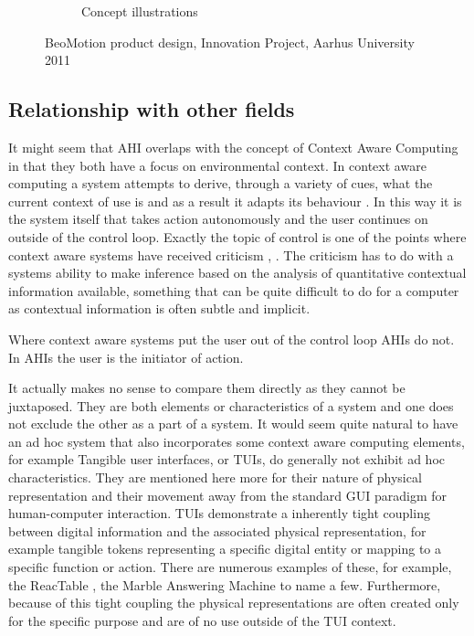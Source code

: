 \begin{figure}
\begin{subfigure}{.54\textwidth}
		\caption{Concept illustrations}
	\end{subfigure}
	\caption{BeoMotion product design, Innovation Project, Aarhus University 2011}
	\label{fig:ch:adhoc:beomotion}
\end{figure}

\subsection{Relationship with other fields} 
It might seem that AHI overlaps with the concept of Context Aware Computing in that they both have a focus on environmental context.
In context aware computing a system attempts to derive, through a variety of cues, what the current context of use is and as a result it adapts its behaviour \citep[chap. 8]{krumm2009ubiquitous}. 
In this way it is the system itself that takes action autonomously and the user continues on outside of the control loop. 
Exactly the topic of control is one of the points where context aware systems have received criticism \cite{erickson2002some}, \citep[chap. 8]{krumm2009ubiquitous}.
The criticism has to do with a systems ability to make inference based on the analysis of quantitative contextual information available, something that can be quite difficult to do for a computer as contextual information is often subtle and implicit.

Where context aware systems put the user out of the control loop AHIs do not.
In AHIs the user is the initiator of action.

It actually makes no sense to compare them directly as they cannot be juxtaposed.
They are both elements or characteristics of a system and one does not exclude the other as a part of a system.
It would seem quite natural to have an ad hoc system that also incorporates some context aware computing elements, for example  
\blank
Tangible user interfaces, or TUIs, do generally not exhibit ad hoc characteristics. 
They are mentioned here more for their nature of physical representation and their movement away from the standard GUI paradigm for human-computer interaction.
TUIs demonstrate a inherently tight coupling between digital information and the associated physical representation, for example tangible tokens representing a specific digital entity or mapping to a specific function or action.
There are numerous examples of these, for example, the ReacTable \cite{jorda2007reactable}, the Marble Answering Machine  to name a few.
Furthermore, because of this tight coupling the physical representations are often created only for the specific purpose and are of no use outside of the TUI context. 

